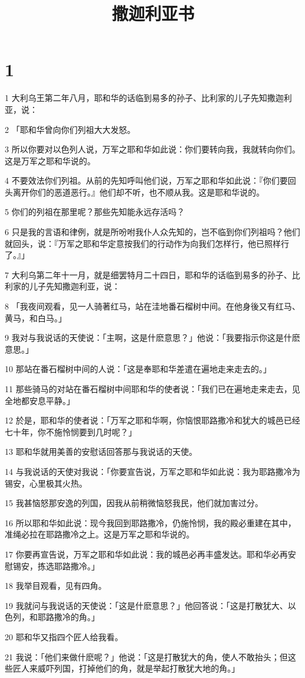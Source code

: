 

\title{撒迦利亚书}


\chapter{1}

\par 1 大利乌王第二年八月，耶和华的话临到易多的孙子、比利家的儿子先知撒迦利亚，说：
\par 2 「耶和华曾向你们列祖大大发怒。
\par 3 所以你要对以色列人说，万军之耶和华如此说：你们要转向我，我就转向你们。这是万军之耶和华说的。
\par 4 不要效法你们列祖。从前的先知呼叫他们说，万军之耶和华如此说：『你们要回头离开你们的恶道恶行。』他们却不听，也不顺从我。这是耶和华说的。
\par 5 你们的列祖在那里呢？那些先知能永远存活吗？
\par 6 只是我的言语和律例，就是所吩咐我仆人众先知的，岂不临到你们列祖吗？他们就回头，说：『万军之耶和华定意按我们的行动作为向我们怎样行，他已照样行了。』」
\par 7 大利乌第二年十一月，就是细罢特月二十四日，耶和华的话临到易多的孙子、比利家的儿子先知撒迦利亚，说：
\par 8 「我夜间观看，见一人骑著红马，站在洼地番石榴树中间。在他身後又有红马、黄马，和白马。」
\par 9 我对与我说话的天使说：「主啊，这是什麽意思？」他说：「我要指示你这是什麽意思。」
\par 10 那站在番石榴树中间的人说：「这是奉耶和华差遣在遍地走来走去的。」
\par 11 那些骑马的对站在番石榴树中间耶和华的使者说：「我们已在遍地走来走去，见全地都安息平静。」
\par 12 於是，耶和华的使者说：「万军之耶和华啊，你恼恨耶路撒冷和犹大的城邑已经七十年，你不施怜悯要到几时呢？」
\par 13 耶和华就用美善的安慰话回答那与我说话的天使。
\par 14 与我说话的天使对我说：「你要宣告说，万军之耶和华如此说：我为耶路撒冷为锡安，心里极其火热。
\par 15 我甚恼怒那安逸的列国，因我从前稍微恼怒我民，他们就加害过分。
\par 16 所以耶和华如此说：现今我回到耶路撒冷，仍施怜悯，我的殿必重建在其中，准绳必拉在耶路撒冷之上。这是万军之耶和华说的。
\par 17 你要再宣告说，万军之耶和华如此说：我的城邑必再丰盛发达。耶和华必再安慰锡安，拣选耶路撒冷。」
\par 18 我举目观看，见有四角。
\par 19 我就问与我说话的天使说：「这是什麽意思？」他回答说：「这是打散犹大、以色列，和耶路撒冷的角。」
\par 20 耶和华又指四个匠人给我看。
\par 21 我说：「他们来做什麽呢？」他说：「这是打散犹大的角，使人不敢抬头；但这些匠人来威吓列国，打掉他们的角，就是举起打散犹大地的角。」

